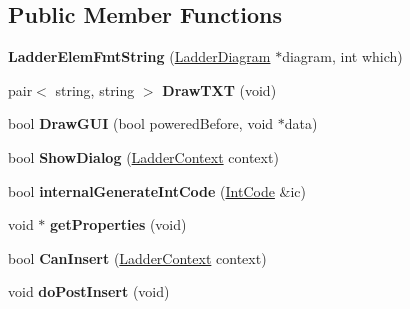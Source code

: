 \subsection*{Public Member Functions}
\begin{DoxyCompactItemize}
\item 
\hypertarget{class_ladder_elem_fmt_string_afce76ad66b7b3997dc58155f837e608e}{{\bfseries Ladder\-Elem\-Fmt\-String} (\hyperlink{class_ladder_diagram}{Ladder\-Diagram} $\ast$diagram, int which)}\label{class_ladder_elem_fmt_string_afce76ad66b7b3997dc58155f837e608e}

\item 
\hypertarget{class_ladder_elem_fmt_string_a347a252ee6c1925b7e69bd9f6bfa835a}{pair$<$ string, string $>$ {\bfseries Draw\-T\-X\-T} (void)}\label{class_ladder_elem_fmt_string_a347a252ee6c1925b7e69bd9f6bfa835a}

\item 
\hypertarget{class_ladder_elem_fmt_string_ac96ca326ed22c44cf195409392ca7fdb}{bool {\bfseries Draw\-G\-U\-I} (bool powered\-Before, void $\ast$data)}\label{class_ladder_elem_fmt_string_ac96ca326ed22c44cf195409392ca7fdb}

\item 
\hypertarget{class_ladder_elem_fmt_string_a1b75a6644f771b4781c4adca3511d1f7}{bool {\bfseries Show\-Dialog} (\hyperlink{struct_ladder_context}{Ladder\-Context} context)}\label{class_ladder_elem_fmt_string_a1b75a6644f771b4781c4adca3511d1f7}

\item 
\hypertarget{class_ladder_elem_fmt_string_a979f8367db6db293792ee55c700b5a0e}{bool {\bfseries internal\-Generate\-Int\-Code} (\hyperlink{class_int_code}{Int\-Code} \&ic)}\label{class_ladder_elem_fmt_string_a979f8367db6db293792ee55c700b5a0e}

\item 
\hypertarget{class_ladder_elem_fmt_string_a715b558fdae5df2c5f5c0ae84c3a0c3d}{void $\ast$ {\bfseries get\-Properties} (void)}\label{class_ladder_elem_fmt_string_a715b558fdae5df2c5f5c0ae84c3a0c3d}

\item 
\hypertarget{class_ladder_elem_fmt_string_aad531e7418f473821cf13d41290bc9ad}{bool {\bfseries Can\-Insert} (\hyperlink{struct_ladder_context}{Ladder\-Context} context)}\label{class_ladder_elem_fmt_string_aad531e7418f473821cf13d41290bc9ad}

\item 
\hypertarget{class_ladder_elem_fmt_string_ab5d3be7a614e9bfbf369c659ef7153b5}{void {\bfseries do\-Post\-Insert} (void)}\label{class_ladder_elem_fmt_string_ab5d3be7a614e9bfbf369c659ef7153b5}


\end{DoxyCompactItemize}
